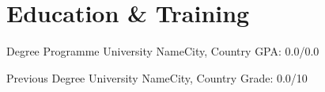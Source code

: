 \section{Education \& Training}

%
  {Degree Programme}%
  {University Name}{City, Country}%
  {GPA: 0.0/0.0}{}

%
  {Previous Degree}%
  {University Name}{City, Country}%
  {Grade: 0.0/10}{}
